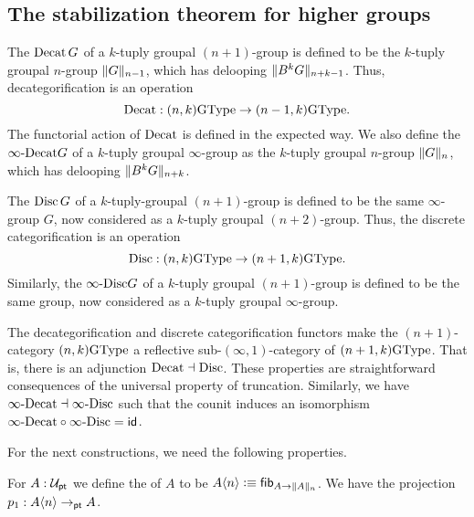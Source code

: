 \subsection{The stabilization theorem for higher groups}
\label{sec:stabilization}

\begin{defn}
The  $\Decat G$ of a $k$-tuply groupal $(n+1)$-group is defined to be the $k$-tuply groupal $n$-group $\trunc{n-1}{G}$, which has delooping $\trunc{n+k-1}{B^kG}$. Thus, decategorification is an operation
\begin{equation*}
\Decat : (n,k)\GType \to (n-1,k)\GType.
\end{equation*}
The functorial action of $\Decat$ is defined in the expected way. We also define the  $\iDecat G$ of a $k$-tuply groupal $\infty$-group as the $k$-tuply groupal $n$-group $\trunc{n}{G}$, which has delooping $\trunc{n+k}{B^k G}$. 
\end{defn}

\begin{defn}
The  $\Disc G$ of a $k$-tuply-groupal $(n+1)$-group is defined to be the same $\infty$-group $G$, now considered as a $k$-tuply groupal $(n+2)$-group. Thus, the discrete categorification is an operation
\begin{equation*}
\Disc : (n,k)\GType \to (n+1,k)\GType.
\end{equation*}
Similarly, the  $\iDisc G$ of a $k$-tuply groupal $(n+1)$-group is defined to be the same group, now considered as a $k$-tuply groupal $\infty$-group.
\end{defn}

\begin{rmk}
The decategorification and discrete categorification functors make the $(n+1)$-category $(n,k)\GType$ a reflective sub-$(\infty,1)$-category of $(n+1,k)\GType$. That is, there is an adjunction ${\Decat} \dashv {\Disc}$. These properties are straightforward consequences of the universal property of truncation.
Similarly, we have ${\iDecat} \dashv {\iDisc}$ such that the counit induces an isomorphism ${\iDecat} \circ {\iDisc} = \idfunc$.
\end{rmk}

For the next constructions, we need the following properties.
\begin{defn}
  For $A : \UU_\pt$ we define the  of $A$ to be 
  $A{\angled n} \defeq  \fibf{A \to \trunc{n}{A}}$. We have the projection $p_1: A{\angled n} \to_\pt A$.
\end{defn}

